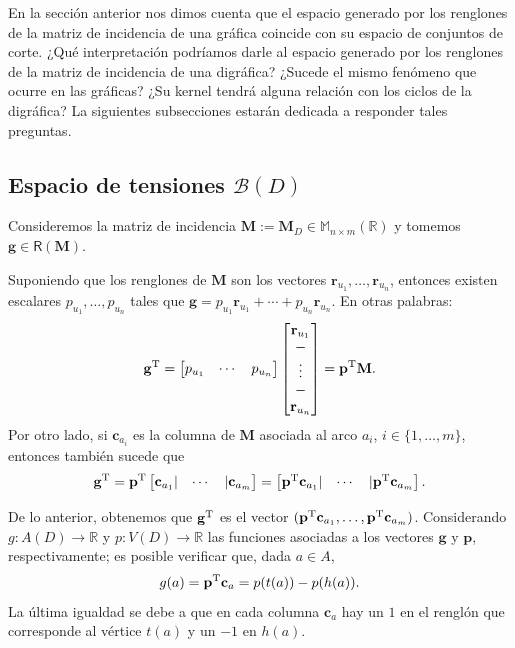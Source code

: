  En la sección anterior nos dimos cuenta que el espacio generado por los renglones de la matriz de incidencia de una gráfica coincide con su espacio de conjuntos de corte. ¿Qué interpretación podríamos darle al espacio generado por los renglones de la matriz de incidencia de una digráfica? ¿Sucede el mismo fenómeno que ocurre en las gráficas? ¿Su kernel tendrá alguna relación con los ciclos de la digráfica? La siguientes subsecciones estarán dedicada a responder tales preguntas. 

\subsection{Espacio de tensiones $\mathcal{B}(D)$}

 Consideremos la matriz de incidencia $\mathbf{M}:=\mathbf{M}_{D} \in \mathbb{M}_{n \times m}(\mathbb{R})$ y tomemos $\mathbf{g}\in \mathsf{R}(\mathbf{M})$.

Suponiendo que los renglones de $\mathbf{M}$ son los vectores $\mathbf{r}_{u_1}, \ldots, \mathbf{r}_{u_n}$, entonces existen escalares $p_{u_{1}}, \ldots, p_{u_{n}}$ tales que $\mathbf{g} = p_{u_{1}}\mathbf{r}_{u_{1}} + \cdots + p_{u_{n}}\mathbf{r}_{u_{n}}$. En otras palabras:
$$
\mathbf{g}^{\textnormal{T}} = \begin{bmatrix}
p_{u_{1}} & \cdots & p_{u_{n}} 
\end{bmatrix}
\begin{bmatrix}
\mathbf{r}_{u_{1}}\\ 
\-- \\
\vdots\\
\--\\
\mathbf{r}_{u_{n}}
\end{bmatrix} = \mathbf{p}^{\textnormal{T}}\mathbf{M}.
$$
Por otro lado, si $\mathbf{c}_{a_{i}}$ es la columna de $\mathbf{M}$ asociada al arco $a_{i}$, $i \in \{1, \ldots, m\}$, entonces también sucede que $$\mathbf{g}^{{\textnormal{T}}}=\mathbf{p}^{\textnormal{T}}\begin{bmatrix}
\mathbf{c}_{a_{1}} | & \cdots & |\mathbf{c}_{a_{m}} 
\end{bmatrix} = \begin{bmatrix}
\mathbf{p}^{\textnormal{T}}\mathbf{c}_{a_{1}} | & \cdots & |\mathbf{p}^{\textnormal{T}}\mathbf{c}_{a_{m}} 
\end{bmatrix}.
$$

De lo anterior, obtenemos que $\mathbf{g}^{\textnormal{T}}$ es el vector $(\mathbf{p}^{\textnormal{T}}\mathbf{c}_{a_{1}},  \ldots, \mathbf{p}^{\textnormal{T}}\mathbf{c}_{a_{m}})$. Considerando $g\colon A(D) \rightarrow \mathbb{R}$ y $p \colon V(D) \rightarrow \mathbb{R}$ las funciones asociadas a los vectores $\mathbf{g}$ y $\mathbf{p}$, respectivamente; es posible verificar que, dada $a \in A$, 
\begin{equation} \label{eq:tensiones}
    g(a) = \mathbf{p}^{\textnormal{T}}\mathbf{c}_{a} = p(t(a)) - p(h(a)).
\end{equation}
La última igualdad se debe a que en cada columna $\mathbf{c}_{a}$ hay un $1$ en el renglón que corresponde al vértice $t(a)$ y un $-1$ en $h(a)$.

